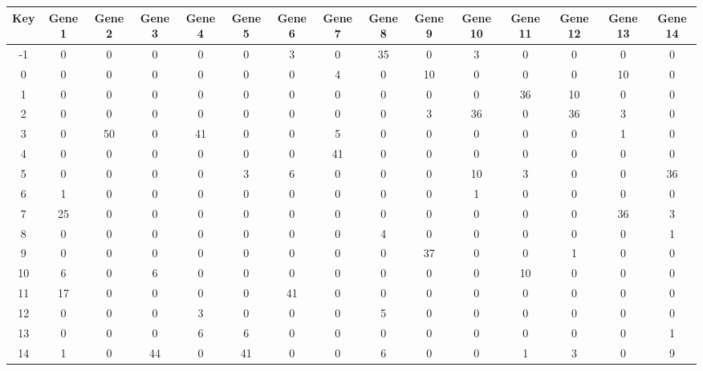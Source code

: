\begin{tabular}{|c|c|c|c|c|c|c|c|c|c|c|c|c|c|c|}
\hline
Key & Gene 1 & Gene 2 & Gene 3 & Gene 4 & Gene 5 & Gene 6 & Gene 7 & Gene 8 & Gene 9 & Gene 10 & Gene 11 & Gene 12 & Gene 13 & Gene 14 \\
\hline
-1 & 0 & 0 & 0 & 0 & 0 & 3 & 0 & 35 & 0 & 3 & 0 & 0 & 0 & 0 \\
0 & 0 & 0 & 0 & 0 & 0 & 0 & 4 & 0 & 10 & 0 & 0 & 0 & 10 & 0 \\
1 & 0 & 0 & 0 & 0 & 0 & 0 & 0 & 0 & 0 & 0 & 36 & 10 & 0 & 0 \\
2 & 0 & 0 & 0 & 0 & 0 & 0 & 0 & 0 & 3 & 36 & 0 & 36 & 3 & 0 \\
3 & 0 & 50 & 0 & 41 & 0 & 0 & 5 & 0 & 0 & 0 & 0 & 0 & 1 & 0 \\
4 & 0 & 0 & 0 & 0 & 0 & 0 & 41 & 0 & 0 & 0 & 0 & 0 & 0 & 0 \\
5 & 0 & 0 & 0 & 0 & 3 & 6 & 0 & 0 & 0 & 10 & 3 & 0 & 0 & 36 \\
6 & 1 & 0 & 0 & 0 & 0 & 0 & 0 & 0 & 0 & 1 & 0 & 0 & 0 & 0 \\
7 & 25 & 0 & 0 & 0 & 0 & 0 & 0 & 0 & 0 & 0 & 0 & 0 & 36 & 3 \\
8 & 0 & 0 & 0 & 0 & 0 & 0 & 0 & 4 & 0 & 0 & 0 & 0 & 0 & 1 \\
9 & 0 & 0 & 0 & 0 & 0 & 0 & 0 & 0 & 37 & 0 & 0 & 1 & 0 & 0 \\
10 & 6 & 0 & 6 & 0 & 0 & 0 & 0 & 0 & 0 & 0 & 10 & 0 & 0 & 0 \\
11 & 17 & 0 & 0 & 0 & 0 & 41 & 0 & 0 & 0 & 0 & 0 & 0 & 0 & 0 \\
12 & 0 & 0 & 0 & 3 & 0 & 0 & 0 & 5 & 0 & 0 & 0 & 0 & 0 & 0 \\
13 & 0 & 0 & 0 & 6 & 6 & 0 & 0 & 0 & 0 & 0 & 0 & 0 & 0 & 1 \\
14 & 1 & 0 & 44 & 0 & 41 & 0 & 0 & 6 & 0 & 0 & 1 & 3 & 0 & 9 \\
\hline
\end{tabular}